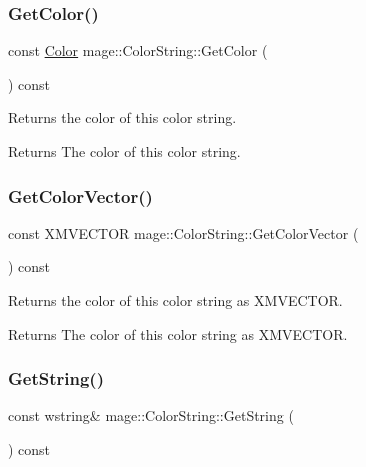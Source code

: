 \subsubsection{\texorpdfstring{Get\+Color()}{GetColor()}}
{\footnotesize\ttfamily const \hyperlink{structmage_1_1_color}{Color} mage\+::\+Color\+String\+::\+Get\+Color (\begin{DoxyParamCaption}{ }\end{DoxyParamCaption}) const\hspace{0.3cm}{\ttfamily [noexcept]}}

Returns the color of this color string.

\begin{DoxyReturn}{Returns}
The color of this color string. 
\end{DoxyReturn}
\hypertarget{structmage_1_1_color_string_a9326950147ecdc3c09909518e0dddb76}{}\label{structmage_1_1_color_string_a9326950147ecdc3c09909518e0dddb76} 
\subsubsection{\texorpdfstring{Get\+Color\+Vector()}{GetColorVector()}}
{\footnotesize\ttfamily const X\+M\+V\+E\+C\+T\+OR mage\+::\+Color\+String\+::\+Get\+Color\+Vector (\begin{DoxyParamCaption}{ }\end{DoxyParamCaption}) const\hspace{0.3cm}{\ttfamily [noexcept]}}

Returns the color of this color string as {\ttfamily X\+M\+V\+E\+C\+T\+OR}.

\begin{DoxyReturn}{Returns}
The color of this color string as {\ttfamily X\+M\+V\+E\+C\+T\+OR}. 
\end{DoxyReturn}
\hypertarget{structmage_1_1_color_string_aee22268a2fe552320299dfa5ac5a93e1}{}\label{structmage_1_1_color_string_aee22268a2fe552320299dfa5ac5a93e1} 
\subsubsection{\texorpdfstring{Get\+String()}{GetString()}}
{\footnotesize\ttfamily const wstring\& mage\+::\+Color\+String\+::\+Get\+String (\begin{DoxyParamCaption}{ }\end{DoxyParamCaption}) const\hspace{0.3cm}{\ttfamily [noexcept]}}

